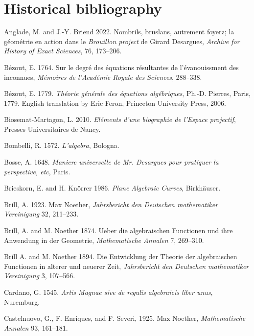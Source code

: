 \section{Historical bibliography}
\frenchspacing
\def\newline{\par\hangindent=10pt\hangafter=1}
\parindent=0pt %
\small
\newline
\indent Anglade, M. and J.-Y. Briend 2022. Nombrils, bruslans, autrement foyerz; la g\'eom\'etrie en action dans le \emph{Brouillon project} de Girard Desargues, \emph{Archive for History of Exact Sciences}, 76, 173--206.
\newline\indent B\'ezout, E. 1764. Sur le degr\'e des \'equations r\'esultantes de l'\'evanouissment des inconnues, \emph{M\'emoires de l'Acad\'emie Royale des Sciences}, 288--338.
\newline\indent B\'ezout, E. 1779. \emph{Th\'eorie g\'en\'erale des \'equations alg\'ebriques}, Ph.-D. Pierres, Paris, 1779. English translation by Eric Feron, Princeton University Press, 2006.
\newline\indent  Biosemat-Martagon, L. 2010. \emph{El\'ements d'une biographie de l'Espace projectif}, Presses Universitaires de Nancy.
\newline\indent Bombelli, R. 1572. \emph{L'algebra}, Bologna.
\newline\indent Bosse, A.  1648. \emph{Maniere universelle de Mr. Desargues pour pratiquer la perspective, etc}, Paris.
\newline\indent Brieskorn, E. and  H. Kn\"orrer 1986. \emph{Plane Algebraic Curves}, Birkh\"auser.
\newline\indent Brill, A. 1923. Max Noether, \emph{Jahrsbericht den Deutschen mathematiker Vereinigung} 32, 211--233.
\newline\indent Brill, A. and M. Noether  1874.  Ueber die algebraischen Functionen und ihre Anwendung in der Geometrie, \emph{Mathematische Annalen} 7, 269--310.
\newline\indent Brill A. and M. Noether 1894.  Die Entwicklung der Theorie der algebraischen Functionen in alterer und neuerer Zeit, \emph{Jahrsbericht den Deutschen mathematiker Vereinigung} 3, 107--566.
\newline\indent Cardano, G. 1545.  \emph{Artis Magnae sive de regulis algebraicis liber unus}, Nuremburg. 
\newline\indent Castelnuovo, G., F. Enriques, and F. Severi, 1925. Max Noether, \emph{Mathematische Annalen} 93, 161--181.
